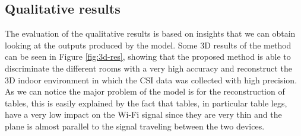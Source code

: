 \documentclass[binding=0.6cm,noexaminfo]{sapthesis}
\begin{document}
\subsection{Qualitative results}

The evaluation of the qualitative results is based on insights that we can obtain looking at the outputs produced by the model. Some 3D results of the method can be seen in Figure \ref{fig:3d-res}, showing that the proposed method is able to discriminate the different rooms with a very high accuracy and reconstruct the 3D indoor environment in which the CSI data was collected with high precision. As we can notice the major problem of the model is for the reconstruction of tables, this is easily explained by the fact that tables, in particular table legs, have a very low impact on the Wi-Fi signal since they are very thin and the plane is almost parallel to the signal traveling between the two devices.
\end{document}
